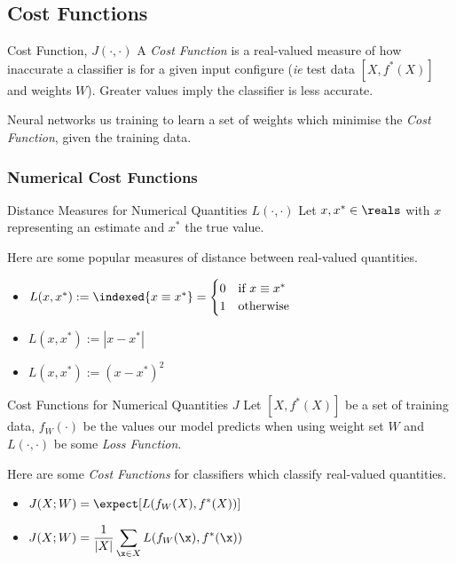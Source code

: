 \documentclass[11pt,a4paper]{article}
\begin{document}
\subsection{Cost Functions} \label{sec_CostFunctions}

  \begin{definition}{Cost Function, $J(\cdot,\cdot)$}
    A \textit{Cost Function} is a real-valued measure of how inaccurate a classifier is for a given input configure (\textit{ie} test data $[X,f^*(X)]$ and weights $W$). Greater values imply the classifier is less accurate.
    \par Neural networks us training to learn a set of weights which minimise the \textit{Cost Function}, given the training data.
  \end{definition}

\subsubsection{Numerical Cost Functions} \label{sec_NumericalCostFunctions}

  \begin{proposition}{Distance Measures for Numerical Quantities $L(\cdot,\cdot)$}
    Let $x,x^*\in\reals$ with $x$ representing an estimate and $x^*$ the true value.
    \par Here are some popular measures of distance between real-valued quantities.
    \begin{itemize}
      \item[\textit{Identity Distance}] $L(x,x^*):=\indexed\{x\equiv x^*\}=\begin{cases}0&\text{if }x\equiv x^*\\1&\text{otherwise} \end{cases}$
      \item[\textit{Absolute Distance}] $L(x,x^*):=|x-x^*|$
      \item[\textit{Quadratic Distance}] $L(x,x^*):=(x-x^*)^2$
    \end{itemize}
  \end{proposition}

  \begin{proposition}{Cost Functions for Numerical Quantities $J$}
    Let $[X,f^*(X)]$ be a set of training data, $f_W(\cdot)$ be the values our model predicts when using weight set $W$ and $L(\cdot,\cdot)$ be some \textit{Loss Function}.
    \par Here are some \textit{Cost Functions} for classifiers which classify real-valued quantities.
    \begin{itemize}
      \item[\textit{Expected Loss}] $\displaystyle J(X;W)=\expect[L(f_W(X),f^*(X))]$
      \item[\textit{Empirical Risk}] $\displaystyle J(X;W)=\frac1{|X|}\sum_{\x\in X}L(f_W(\x),f^*(\x))$
    \end{itemize}
  \end{proposition}
\end{document}
